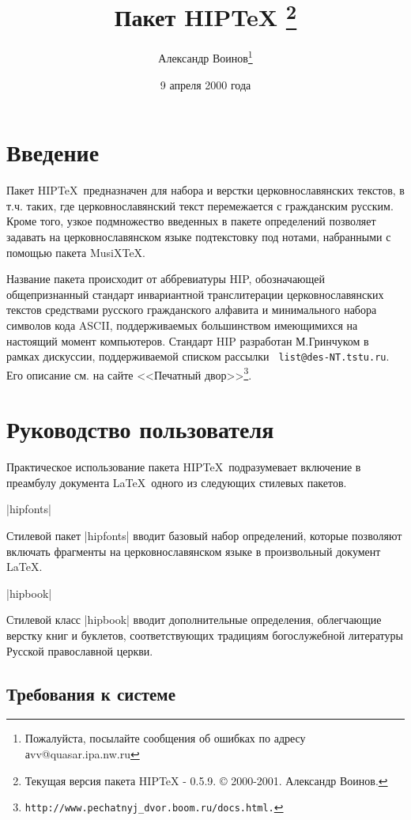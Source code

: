 \documentclass{ltxguide}
\title{Пакет \textsf{HIP\TeX}
\footnote{Текущая версия пакета \textsf{HIP\TeX} - 0.5.9.  \copyright{} 2000-2001.
  Александр Воинов.}}
\author{Александр Воинов\footnote{Пожалуйста, посылайте сообщения об ошибках
по адресу аvv@quasar.ipa.nw.ru}}
\date{9 апреля 2000 года}
\begin{document}
\cs
\civil
\maketitle
\tableofcontents
\section{Введение}

Пакет HIP\TeX\ предназначен для набора и верстки церковнославянских текстов,
в т.ч. таких, где церковнославянский текст перемежается с
гражданским русским. Кроме того, узкое подмножество введенных в пакете
определений позволяет задавать на церковнославянском языке подтекстовку под
нотами, набранными с помощью пакета MusiX\TeX.

Название пакета происходит от аббревиатуры HIP, обозначающей
общепризнанный стандарт инвариантной транслитерации церковнославянских
текстов средствами русского гражданского алфавита и минимального
набора символов кода ASCII, поддерживаемых большинством имеющимихся на
настоящий момент компьютеров. Стандарт HIP разработан М.Гринчуком в
рамках дискуссии, поддерживаемой списком рассылки {\tt
  \hbox{list@des-NT.tstu.ru}}. Его описание см. на сайте <<Печатный
двор>>\footnote{\tt http://www.pechatnyj\_dvor.boom.ru/docs.html.}.

\section{Руководство пользователя}

Практическое использование пакета HIP\TeX\ подразумевает включение в преамбулу
документа \LaTeX\ одного из следующих стилевых пакетов.

\begin{decl}
|hipfonts|
\end{decl}

Стилевой пакет |hipfonts| вводит базовый набор определений, которые позволяют
включать фрагменты на церковнославянском языке в произвольный документ \LaTeX.

\begin{decl}
|hipbook|
\end{decl}

Стилевой класс |hipbook| вводит дополнительные определения, облегчающие
верстку книг и буклетов, соответствующих традициям богослужебной литературы
Русской православной церкви.

\subsection{Требования к системе}
\end{document}
